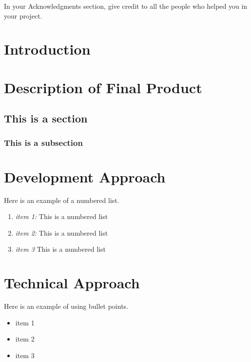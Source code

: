 \documentclass[]{UCD_CS_47360_Report}
\begin{document}
In your Acknowledgments section, give credit to all the people who helped you in your project.



\tableofcontents{}\newpage
\newpage



\chapter{Introduction}



\chapter{\label{chapter2} Description of Final Product}

\section{This is a section}
\subsection{This is a subsection}

\chapter{\label{chapter3} Development Approach}
Here is an example of a numbered list.
\begin{enumerate}
\item {\sl item 1:} This is a numbered list
\item {\sl  item 2:} This is a numbered list
\item {\sl item 3} This is a numbered list
\end{enumerate}

\chapter{\label{chapter4}Technical Approach}
Here is an example of using bullet points.
\begin{itemize}
\item item 1
\item item 2
\item item 3
\end{itemize}
\end{document}
